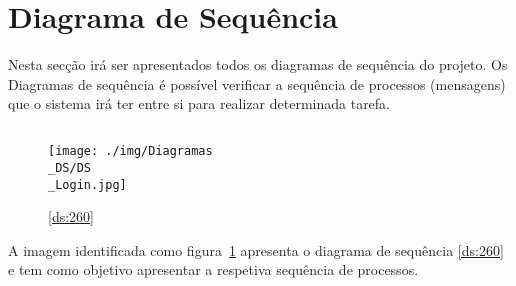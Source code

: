 \section{Diagrama de Sequência}

\par Nesta secção irá ser apresentados todos os diagramas de sequência do projeto. Os Diagramas de sequência é possível verificar a sequência de processos (mensagens) que o sistema irá ter entre si para realizar determinada tarefa.

\subsection{}

\begin{figure}[H]
	\centering
	\texttt{[image: ./img/Diagramas\\\_DS/DS\\\_Login.jpg]}  %
	\caption{\ref{ds:260}}
	\label{fig:chap260}
\end{figure}

\par A imagem identificada como figura~\ref{fig:chap260} apresenta o diagrama de sequência \ref{ds:260} e tem como objetivo apresentar a respetiva sequência de processos.


\newpage


\newpage